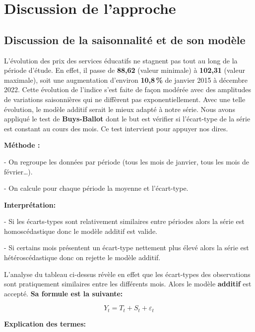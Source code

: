 \documentclass[
12pt,          %
a4paper,       %
oneside,       %
openright      %
]{report}
\begin{document}
 \section{ Discussion de l'approche }
 \subsection{ Discussion de la saisonnalité et de son modèle}
  L'évolution des prix des services éducatifs ne stagnent pas tout au long de la période d'étude. En effet, il passe de \textbf{88,62} (valeur minimale) à \textbf{102,31} (valeur maximale), soit une augmentation d'environ \textbf{10,8\,\%} de janvier 2015 à décembre 2022. Cette évolution de l'indice s'est faite de façon modérée avec des amplitudes de variations saisonnières qui ne diffèrent pas exponentiellement. Avec une telle évolution, le modèle additif serait le mieux adapté à notre série. Nous avons appliqué le test de \textbf{Buys-Ballot} dont le but est  vérifier si l'écart-type de la série est constant au cours des mois. Ce test intervient pour appuyer nos dires.
   
  \textbf{Méthode :} 
  
  - On regroupe les données par période (tous les mois de janvier, tous les mois de février…).
  
  - On calcule pour chaque période la moyenne et l’écart-type.
  
  \textbf{Interprétation:} 
  
  - Si les écarts-types sont relativement similaires entre périodes alors la série est homoscédastique donc le modèle additif est valide.
  
  - Si certains mois présentent un écart-type nettement plus élevé alors la série est hétéroscédastique donc on rejette le modèle additif.
  
  \begin{table}[H]
  	\centering
  	
  	\caption{Évolution de la moyenne et de sigma chaque mois-- Test de Buys-Ballot}
  	\label{tab:modele_additif}
  \end{table}
  
  L'analyse du tableau ci-dessus révèle en effet que les écart-types des observations sont pratiquement similaires entre les différents mois. Alors le modèle \textbf{additif} est accepté. 
  \textbf{Sa formule est la suivante:} 
  
  \[
  Y_t = T_t + S_t + \varepsilon_t
  \] 


 \textbf{Explication des termes:}
 
\end{document}
